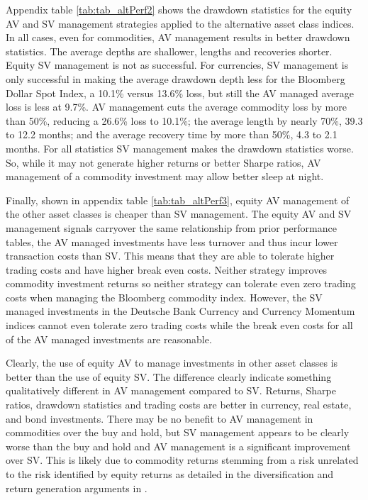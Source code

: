 
Appendix table \ref{tab:tab_altPerf2} shows the drawdown statistics for the equity AV and SV management strategies applied to the alternative asset class indices. In all cases, even for commodities, AV management results in better drawdown statistics. The average depths are shallower, lengths and recoveries shorter. Equity SV management is not as successful. For currencies, SV management is only successful in making the average drawdown depth less for the Bloomberg Dollar Spot Index, a 10.1\% versus 13.6\% loss, but still the AV managed average loss is less at 9.7\%. AV management cuts the average commodity loss by more than 50\%, reducing a 26.6\% loss to 10.1\%; the average length by nearly 70\%, 39.3 to 12.2 months; and the average recovery time by more than 50\%, 4.3 to 2.1 months. For all statistics SV management makes the drawdown statistics worse. So, while it may not generate higher returns or better Sharpe ratios, AV management of a commodity investment may allow better sleep at night.


Finally, shown in appendix table \ref{tab:tab_altPerf3}, equity AV management of the other asset classes is cheaper than SV management. The equity AV and SV management signals carryover the same relationship from prior performance tables, the AV managed investments have less turnover and thus incur lower transaction costs than SV. This means that they are able to tolerate higher trading costs and have higher break even costs. Neither strategy improves commodity investment returns so neither strategy can tolerate even zero trading costs when managing the Bloomberg commodity index. However, the SV managed investments in the Deutsche Bank Currency and Currency Momentum indices cannot even tolerate zero trading costs while the break even costs for all of the AV managed investments are reasonable. 

Clearly, the use of equity AV to manage investments in other asset classes is better than the use of equity SV. The difference clearly indicate something qualitatively different in AV management compared to SV. Returns, Sharpe ratios, drawdown statistics and trading costs are better in currency, real estate, and bond investments. There may be no benefit to AV management in commodities over the buy and hold, but SV management appears to be clearly worse than the buy and hold and AV management is a significant improvement over SV. This is likely due to commodity returns stemming from a risk unrelated to the risk identified by equity returns as detailed in the diversification and return generation arguments in \citet{gorton_facts_2006,buyuksahin_commodities_2008,NBERw21243,erb_conquering_nodate}. %

